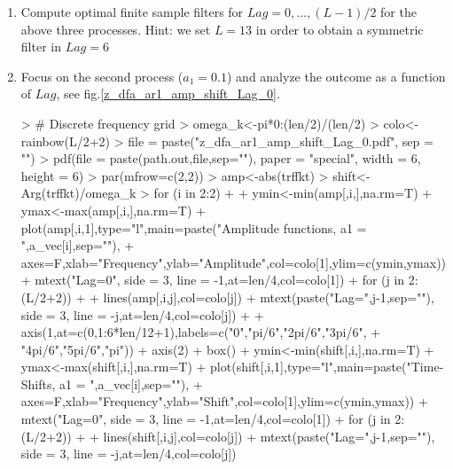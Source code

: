 \documentclass[a4paper]{book}
\begin{document}
\begin{enumerate}
\item  Compute optimal finite sample filters for $Lag=0,...,(L-1)/2$ for
the above three processes. Hint: we set $L=13$ in order to obtain a symmetric filter in $Lag=6$

\begin{Schunk}
\end{Schunk}
\item Focus on the second process ($a_1=0.1$) and analyze the outcome as a function of $Lag$, see fig.\ref{z_dfa_ar1_amp_shift_Lag_0}.
\begin{Schunk}
\begin{Sinput}
> # Discrete frequency grid
> omega_k<-pi*0:(len/2)/(len/2)
> colo<-rainbow(L/2+2)
> file = paste("z_dfa_ar1_amp_shift_Lag_0.pdf", sep = "")
> pdf(file = paste(path.out,file,sep=""), paper = "special", width = 6, height = 6)
> par(mfrow=c(2,2))
> amp<-abs(trffkt)
> shift<-Arg(trffkt)/omega_k
> for (i in 2:2)
+ {
+   ymin<-min(amp[,i,],na.rm=T)
+   ymax<-max(amp[,i,],na.rm=T)
+   plot(amp[,i,1],type="l",main=paste("Amplitude functions, a1 = ",a_vec[i],sep=""),
+   axes=F,xlab="Frequency",ylab="Amplitude",col=colo[1],ylim=c(ymin,ymax))
+   mtext("Lag=0", side = 3, line = -1,at=len/4,col=colo[1])
+   for (j in 2:(L/2+2))
+   {
+     lines(amp[,i,j],col=colo[j])
+     mtext(paste("Lag=",j-1,sep=""), side = 3, line = -j,at=len/4,col=colo[j])
+   }
+   axis(1,at=c(0,1:6*len/12+1),labels=c("0","pi/6","2pi/6","3pi/6",
+   "4pi/6","5pi/6","pi"))
+   axis(2)
+   box()
+   ymin<-min(shift[,i,],na.rm=T)
+   ymax<-max(shift[,i,],na.rm=T)
+   plot(shift[,i,1],type="l",main=paste("Time-Shifts, a1 = ",a_vec[i],sep=""),
+   axes=F,xlab="Frequency",ylab="Shift",col=colo[1],ylim=c(ymin,ymax))
+   mtext("Lag=0", side = 3, line = -1,at=len/4,col=colo[1])
+   for (j in 2:(L/2+2))
+   {
+     lines(shift[,i,j],col=colo[j])
+     mtext(paste("Lag=",j-1,sep=""), side = 3, line = -j,at=len/4,col=colo[j])
}}
\end{Sinput}
\end{Schunk}
\end{enumerate}
\end{document}
